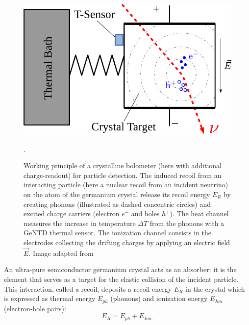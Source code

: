 \begin{figure}
\centering
\includegraphics[scale=1]{Figures/Experiment/crystalline_detector_principle.pdf}
\caption{Working principle of a crystalline bolometer (here with additional charge-readout) for particle detection. The induced recoil from an interacting particle (here a nuclear recoil from an incident neutrino) on the atom of the germanium crystal release its recoil energy $E_R$ by creating phonons (illustrated as dashed concentric circles) and excited charge carriers (electron $e^-$ and holes $h^+$). The heat channel measures the increase in temperature $\Delta T$ from the phonons with a GeNTD thermal sensor. The ionization channel consists in the electrodes collecting the drifting charges by applying an electric field $\vec{E}$. Image adapted from \cite{Schumann:2019eaa}}.
\label{fig:detector-principle}
\end{figure}

An ultra-pure semiconductor germanium crystal acts as an absorber: it is the element that serves as a target for the elastic collision of the incident particle. This interaction, called a recoil, deposits a recoil energy $E_R$ in the crystal which is expressed as thermal energy $E_{ph}$ (phonons) and ionization energy $E_{Ion.}$ (electron-hole pairs):
\begin{equation}
\label{energy}
E_R = E_{ph} + E_{Ion.}
\end{equation}

